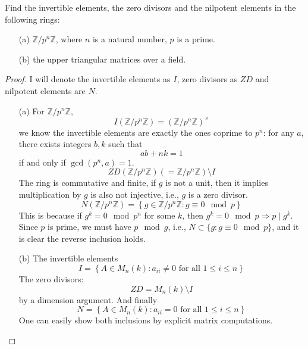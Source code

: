 \documentclass[openany]{book}
\newcommand{\Z}{\mathbb{Z}}
\begin{document}
\begin{prob}
    Find the invertible elements, the zero divisors and the nilpotent elements in the following rings:
    \begin{itemize}
        \item[(a)] \(\mathbb{Z}/p^n\mathbb{Z}\), where \(n\) is a natural number, \(p\) is a prime.
        \item[(b)] the upper triangular matrices over a field.
    \end{itemize}
\end{prob}
\begin{proof}
    I will denote the invertible elements as $I$, zero divisors as $ZD$ and nilpotent elements are $N$.
    \begin{itemize}
        \item[(a)] For $\Z/p^n\Z$,
        \begin{equation*}
            I(\Z/p^{n}\Z)=(\Z/p^n\Z)^\times
        \end{equation*}
        we know the invertible elements are exactly the ones coprime to $p^n$: for any $a$, there exists integers $b,k$ such that 
        \begin{equation*}
            ab+nk=1
        \end{equation*}
        if and only if $\gcd(p^n,a)=1$.
        \begin{equation*}
            ZD(\Z/p^n\Z)(=\Z/p^n\Z)\setminus I
        \end{equation*}
        The ring is commutative and finite, if $g$ is not a unit, then it implies multiplication by $g$ is also not injective, i.e., $g$ is a zero divisor.
        \begin{equation*}
            N(\Z/p^n\Z)=\left\{g\in\Z/p^n\Z: g\equiv 0\mod p\right\}
        \end{equation*}
        This is because if $g^k=0\mod p^n$ for some $k$, then $g^k=0\mod p\Rightarrow p\mid g^k$. Since $p$ is prime, we must have $p\mod g$, i.e., $N\subset \{g: g\equiv 0\mod p\}$, and it is clear the reverse inclusion holds.

        
        \item[(b)] The invertible elements 
        \begin{equation*}
            I=\left\{A\in M_{n}(k): a_{ii}\neq 0 \text{ for all } 1\leq i\leq n\right\}
        \end{equation*}
        The zero divisors:
        \begin{equation*}
            ZD=M_n(k)\setminus I
        \end{equation*}
        by a dimension argument. And finally
        \begin{equation*}
            N=\left\{A\in M_n(k): a_{ii}=0 \text{ for all } 1\leq i\leq n\right\}
        \end{equation*}
        One can easily show both inclusions by explicit matrix computations.
    \end{itemize}
\end{proof}
\end{document}
